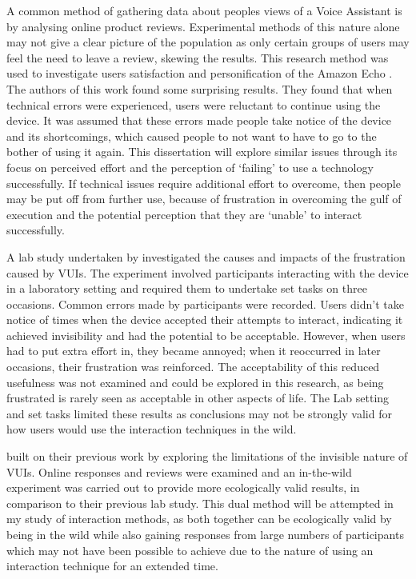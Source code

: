 \documentclass{l4proj}
\begin{document}
A common method of gathering data about peoples views of a Voice Assistant is by analysing online product reviews. Experimental methods of this nature alone may not give a clear picture of the population as only certain groups of users may feel the need to leave a review, skewing the results. This research method was used to investigate users satisfaction and personification of the Amazon Echo \citep{purington_alexa_2017}. The authors of this work found some surprising results. They found that when technical errors were experienced, users were reluctant to continue using the device. It was assumed that these errors made people take notice of the device and its shortcomings, which caused people to not want to have to go to the bother of using it again. This dissertation will explore similar issues through its focus on perceived effort and the perception of `failing' to use a technology successfully. If technical issues require additional effort to overcome, then people may be put off from further use, because of frustration in overcoming the gulf of execution and the potential perception that they are `unable' to interact successfully.

A lab study undertaken by \citet{myers_patterns_2018} investigated the causes and impacts of the frustration caused by VUIs. The experiment involved participants interacting with the device in a laboratory setting and required them to undertake set tasks on three occasions. Common errors made by participants were recorded. Users didn't take notice of times when the device accepted their attempts to interact, indicating it achieved invisibility and had the potential to be acceptable. However, when users had to put extra effort in, they became annoyed; when it reoccurred in later occasions, their frustration was reinforced. The acceptability of this reduced usefulness was not examined and could be explored in this research, as being frustrated is rarely seen as acceptable in other aspects of life. The Lab setting and set tasks limited these results as conclusions may not be strongly valid for how users would use the interaction techniques in the wild.

\citep{myers_impact_2019}built on their previous work by exploring the limitations of the invisible nature of VUIs. Online responses and reviews were examined and an in-the-wild experiment was carried out to provide more ecologically valid results, in comparison to their previous lab study. This dual method will be attempted in my study of interaction methods, as both together can be ecologically valid by being in the wild while also gaining responses from large numbers of participants which may not have been possible to achieve due to the nature of using an interaction technique for an extended time.
\end{document}
